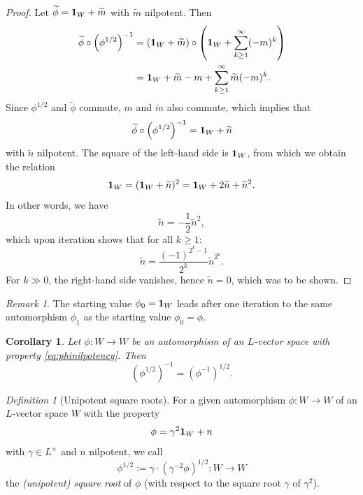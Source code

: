\documentclass[a4paper,12pt,reqno]{amsart}
\theoremstyle{plain}
\newtheorem{corollary}[theorem]{Corollary}
\theoremstyle{remark}
\newtheorem{remark}[theorem]{Remark}
\newtheorem{definition}[theorem]{Definition}
\begin{document}
\begin{proof}
      Let $\widetilde{\phi}={\bf1}_W+\widetilde{m}$ with $\widetilde{m}$ nilpotent. Then
      \begin{align*}
        \widetilde{\phi}\circ \left(\phi^{1/2}\right)^{-1}
        &=({\bf1}_W+\widetilde{m})\circ\left({\bf1}_W+\sum_{k\geq 1}^\infty (-m)^k\right)\\
        &={\bf1}_W+\widetilde{m}-m+\sum_{k\geq 1}^\infty \widetilde{m}(-m)^k.
      \end{align*}
      Since $\phi^{1/2}$ and $\widetilde{\phi}$ commute, $m$ and $\widetilde{m}$ also commute, which implies that
      \[
      \widetilde{\phi}\circ \left(\phi^{1/2}\right)^{-1}={\bf1}_W+\widetilde{n}
      \]
      with $\widetilde{n}$ nilpotent. The square of the left-hand side is ${\bf1}_W$, from which we obtain the relation
      \[
      {\bf1}_W=({\bf1}_W+\widetilde{n})^2={\bf1}_W+2\widetilde{n}+\widetilde{n}^2.
      \]
      In other words, we have
      \[
      \widetilde{n}=-\frac{1}{2}\widetilde{n}^2,
      \]
      which upon iteration shows that for all $k \ge 1$:
      \[
      \widetilde{n}=\frac{(-1)^{2^k-1}}{2^k}\widetilde{n}^{2^k}.
      \]
      For $k \gg 0$, the right-hand side vanishes, hence $\widetilde{n}=0$, which was to be shown.
    \end{proof}
    
    \begin{remark}
      The starting value $\phi_0 = {\bf1}_W$ leads after one iteration to the same automorphism $\phi_1$ as the starting value $\phi_0 = \phi$.
    \end{remark}

    \begin{corollary}
      Let $\phi\colon W \to W$ be an automorphism of an $L$-vector space with property \eqref{eq:phinilpotency}. Then
      \begin{equation}
        \left(\phi^{1/2}\right)^{-1}=
        \left(\phi^{-1}\right)^{1/2}.
        \label{eq:squarerootinverses}
      \end{equation}
    \end{corollary}

    \begin{definition}[Unipotent square roots]\label{def:squareroots}
      For a given automorphism $\phi\colon W \to W$ of an $L$-vector space $W$ with the property
      \begin{equation}
        \phi=\gamma^2{\bf1}_{W}+n
        \label{eq:phigammanilpotency}
      \end{equation}
      with $\gamma \in L^\times$ and $n$ nilpotent, we call
      \[
      \phi^{1/2}:=\gamma\cdot\left(\gamma^{-2}\phi\right)^{1/2}\colon W\to W
      \]
      the {\em (unipotent) square root} of $\phi$ (with respect to the square root $\gamma$ of $\gamma^2$).
    \end{definition}
\end{document}
